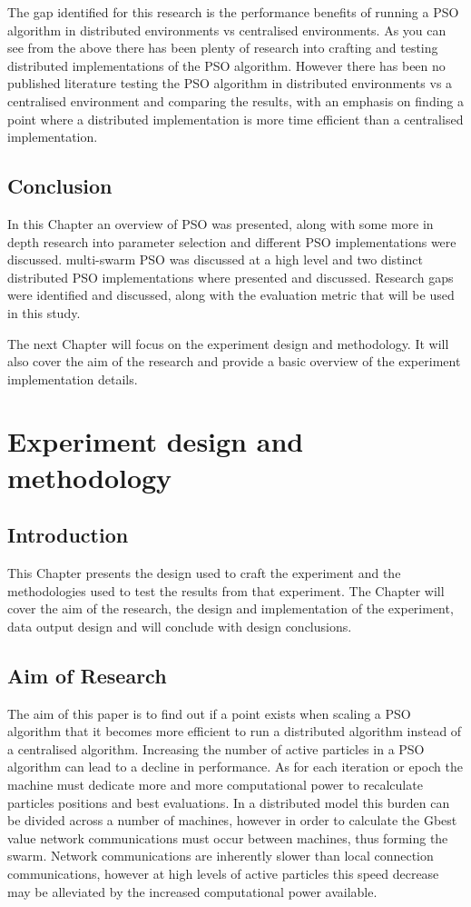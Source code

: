 \documentclass[oneside,12pt]{book}
\begin{document}
The gap identified for this research is the performance benefits of running a PSO algorithm in distributed environments vs centralised environments. As you can see from the above there has been plenty of research into crafting and testing distributed implementations of the PSO algorithm. However there has been no published literature testing the PSO algorithm in distributed environments vs a centralised environment and comparing the results, with an emphasis on finding a point where a distributed implementation is more time efficient than a centralised implementation. 

\section{Conclusion}
In this Chapter an overview of PSO was presented, along with some more in depth research into parameter selection and different PSO implementations were discussed. multi-swarm PSO was discussed at a high level and two distinct distributed PSO implementations where presented and discussed.
Research gaps were identified and discussed, along with the evaluation metric that will be used in this study. 

The next Chapter will focus on the experiment design and methodology. It will also cover the aim of the research and provide a basic overview of the experiment implementation details.


\chapter{Experiment design and methodology}
\section{Introduction}
This Chapter presents the design used to craft the experiment and the methodologies used to test the results from that experiment. The Chapter will cover the aim of the research, the design and implementation of the experiment, data output design and will conclude with design conclusions. 
\section{Aim of Research}
The aim of this paper is to find out if a point exists when scaling a PSO algorithm that it becomes more efficient to run a distributed algorithm instead of a centralised algorithm. Increasing the number of active particles in a PSO algorithm can lead to a decline in performance. As for each iteration or epoch the machine must dedicate more and more computational power to recalculate particles positions and best evaluations. In a distributed model this burden can be divided across a number of machines, however in order to calculate the Gbest value network communications must occur between machines, thus forming the swarm. Network communications are inherently slower than local connection communications, however at high levels of active particles this speed decrease may be alleviated by the increased computational power available. 
\end{document}

